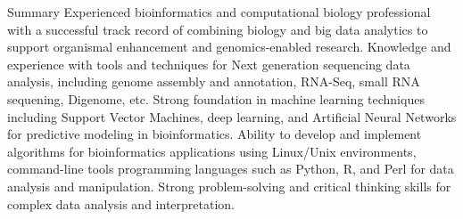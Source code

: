\begin{rubric}{Summary}
\entryy[] Experienced bioinformatics and computational biology professional with a successful track record of combining biology and big data analytics to support organismal enhancement and genomics-enabled research. 
\entryy[] Knowledge and experience with tools and techniques for Next generation sequencing data analysis, including genome assembly and annotation, RNA-Seq, small RNA sequening, Digenome, etc.
\entryy[] Strong foundation in machine learning techniques including Support Vector Machines, deep learning, and Artificial Neural Networks for predictive modeling in bioinformatics.
\entryy[] Ability to develop and implement algorithms for bioinformatics applications using Linux/Unix environments, command-line tools programming languages such as Python, R, and Perl for data analysis and manipulation.
\entryy[] Strong problem-solving and critical thinking skills for complex data analysis and interpretation.
\end{rubric}